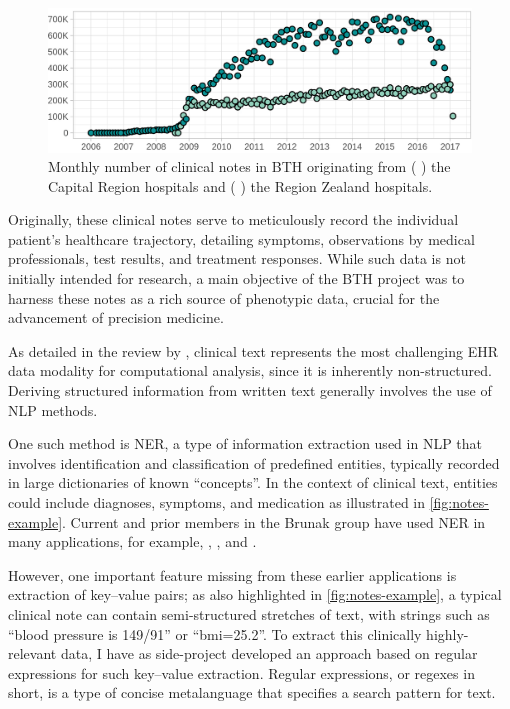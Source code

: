 \begin{figure}
    \includegraphics[width=\textwidth]{graphics/bth-notes}
    \caption{%
        Monthly number of clinical notes in \acf*{BTH}
        originating from 
        (\,\,) the Capital Region hospitals and 
        (\,\,) the Region Zealand hospitals.
    }
    \label{fig:notes-overview}
\end{figure}%

Originally, these clinical notes serve to meticulously record 
the individual patient's healthcare trajectory, detailing symptoms, 
observations by medical professionals, test results, 
and treatment responses.
While such data is not initially intended for research,
a main objective of the \ac{BTH} project was to harness
these notes as a rich source of phenotypic data,
crucial for the advancement of precision medicine.

As detailed in the review by \textcite{jensenMining2012}, 
clinical text represents the most challenging \ac{EHR} data modality for 
computational analysis, since it is inherently non-structured.
Deriving structured information from written text generally involves the
use of \ac{NLP} methods.
~\autocite{jensenMining2012}

One such method is \ac{NER}, a type of information extraction 
used in \ac{NLP} that involves identification and classification 
of predefined entities, typically recorded in large dictionaries
of known \enquote{concepts}.
In the context of clinical text,
entities could include diagnoses, symptoms, and medication
as illustrated in \cref{fig:notes-example}.
Current and prior members in the Brunak group 
have used \ac{NER} in many applications, 
for example,
\textcite{sorupSex2020},
\textcite{hjaltelinPancreatic2023},
and  
\textcite{kirkLinking2019}.

However, one important feature missing from these earlier applications 
is extraction of key--value pairs;
as also highlighted in \cref{fig:notes-example}, 
a typical clinical note can contain
semi-structured stretches of text,
with strings such as \enquote{blood pressure is 149/91}
or \enquote{bmi=25.2}.
To extract this clinically highly-relevant data,
I have as side-project developed an approach based 
on regular expressions for such key--value extraction.
Regular expressions, or regexes in short, 
is a type of concise metalanguage 
that specifies a search pattern for text.
~\autocite{Regular2023}

